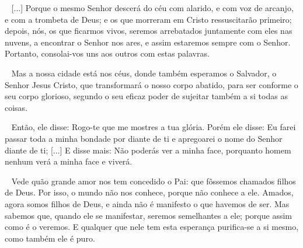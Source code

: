 \documentclass[12pt,aspectratio=169]{beamer}
\newcommand{\ver}[1]{%
    \raisebox{0.50ex}{%
        \scalebox{1.1}{%
            \pmb{\textbf{\textcolor{BSpbg}{#1}}}%
        }%
    }%
}
\newcommand{\QUOTE}[1]{%
    \par\noindent\hspace*{0.1\linewidth}%
    \begin{minipage}{0.8\linewidth}%
        \linespread{1.35}\large{#1}%
    \end{minipage}%
}
\newcommand{\WIDEQUOTE}[1]{%
    \par\noindent\hspace*{0.02\linewidth}%
    \begin{minipage}{0.92\linewidth}%
        \linespread{1.25}\large{#1}%
    \end{minipage}%
}
\newcommand{\ORA}[1]{{\textcolor{TXora}{#1}}}
\newcommand{\YEL}[1]{{\textcolor{TXyel}{#1}}}
\newcommand{\GRE}[1]{{\textcolor{TXgre}{#1}}}
\newcommand{\CYA}[1]{{\textcolor{TXcya}{#1}}}
\newcommand{\BLU}[1]{{\textcolor{TXblu}{#1}}}
\newcommand{\MAG}[1]{{\textcolor{TXmag}{#1}}}
\newcommand{\BRI}[1]{{\textcolor{BSpbg}{#1}}}   %
\begin{document}
    \begin{frame}
        \WIDEQUOTE{%
            \ver{(ARC) 1Ts~4.13--18}~%
            [...] Porque \MAG{o mesmo Senhor descerá do céu com alarido}, e \MAG{com voz  de
            arcanjo}, e \MAG{com a trombeta de Deus};  e  \YEL{os  que  morreram  em  Cristo
            ressuscitarão primeiro};  depois,  nós,  os  que  ficarmos  vivos,  \CYA{seremos
            arrebatados juntamente com eles} nas  nuvens,  a  \BRI{encontrar  o  Senhor  nos
            ares}, e assim \BLU{estaremos sempre com o Senhor}. Portanto, \BRI{consolai-vos}
            uns aos outros com estas palavras.
        }
    \end{frame}

    \begin{frame}
        \QUOTE{%
            \ver{(ARC) Fp~3.20,21}~%
            Mas \CYA{a nossa cidade está nos céus}, donde também \YEL{esperamos o Salvador},
            o Senhor Jesus Cristo, que \MAG{transformará o nosso  corpo  abatido,  para  ser
            conforme o seu corpo glorioso}, segundo o seu eficaz poder de sujeitar também  a
            si todas as coisas.
        }
    \end{frame}

    \begin{frame}
        \QUOTE{%
            \ver{(ARC) Êx~33.18--20}~%
            Então, ele disse: \YEL{Rogo-te que me mostres a tua glória}.  Porém  ele  disse:
            \GRE{Eu farei passar toda a minha bondade por diante de ti e apregoarei  o  nome
            do Senhor diante de ti}; [...] E disse mais: \MAG{Não poderás ver a minha  face,
            porquanto homem nenhum verá a minha face e viverá}.
        }
    \end{frame}

    \begin{frame}
        \WIDEQUOTE{%
            \ver{(ARC) 1Jo~3.1--3}~%
            Vede quão grande amor nos tem concedido o Pai: que fôssemos \YEL{chamados filhos
            de Deus}. Por isso, o mundo não nos conhece, porque não conhece a  ele.  Amados,
            \GRE{agora somos filhos de Deus}, e \ORA{ainda não é manifesto o que havemos  de
            ser}. Mas sabemos que, \MAG{quando ele se manifestar, seremos semelhantes a ele;
            porque assim como é o veremos}. \CYA{E qualquer  que  nele  tem  esta  esperança
            purifica-se a si mesmo, como também ele é puro}.
        }
    \end{frame}
\end{document}
